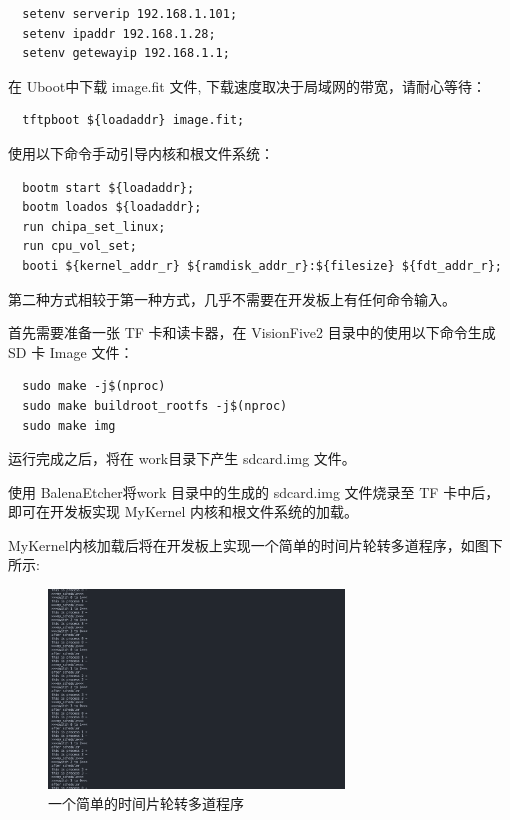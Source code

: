 \documentclass[lang=cn,10pt]{elegantbook}
\begin{document}
\begin{lstlisting}
  setenv serverip 192.168.1.101;
  setenv ipaddr 192.168.1.28;
  setenv getewayip 192.168.1.1;
\end{lstlisting}

在 Uboot中下载 image.fit 文件, 下载速度取决于局域网的带宽，请耐心等待：

\begin{lstlisting}
  tftpboot ${loadaddr} image.fit;
\end{lstlisting}

使用以下命令手动引导内核和根文件系统：
\begin{lstlisting}
  bootm start ${loadaddr};	
  bootm loados ${loadaddr};
  run chipa_set_linux;
  run cpu_vol_set;
  booti ${kernel_addr_r} ${ramdisk_addr_r}:${filesize} ${fdt_addr_r};
\end{lstlisting}

第二种方式相较于第一种方式，几乎不需要在开发板上有任何命令输入。

首先需要准备一张 TF 卡和读卡器，在 VisionFive2 目录中的使用以下命令生成SD 卡 Image 文件：
\begin{lstlisting}
  sudo make -j$(nproc)
  sudo make buildroot_rootfs -j$(nproc)
  sudo make img
\end{lstlisting}

运行完成之后，将在 work目录下产生 sdcard.img 文件。

使用 BalenaEtcher将work 目录中的生成的 sdcard.img 文件烧录至 TF 卡中后， 即可在开发板实现 MyKernel 内核和根文件系统的加载。

MyKernel内核加载后将在开发板上实现一个简单的时间片轮转多道程序，如图下所示:
\begin{figure}[htbp]
  \centering
  \includegraphics[width=0.7\textwidth]{image/mmexport1701419651344.png}
  \caption{一个简单的时间片轮转多道程序}
\end{figure}
\end{document}
